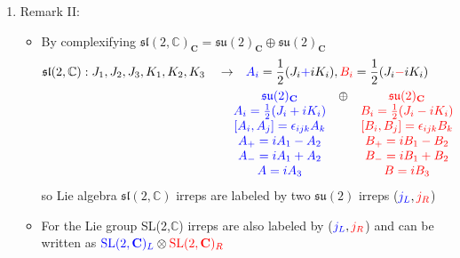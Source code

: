 \documentclass[../main.tex]{subfiles}
\begin{document}
\begin{enumerate}
\item Remark II:
\begin{itemize}
\item By complexifying $\mathfrak{sl}(2,\mathbb{C})_\mathbf{C}=\mathfrak{su}(2)_\mathbf{C}\oplus\mathfrak{su}(2)_\mathbf{C}$
\begin{align}
\mathfrak{sl}(2,\mathbb{C}): J_1,J_2,J_3,K_1,K_2,K_3\quad\rightarrow&\quad \textcolor{blue}{A_i}=\frac{1}{2}(J_i\textcolor{blue}{+}iK_i),\textcolor{red}{B_i}=\frac{1}{2}(J_i\textcolor{red}{-}iK_i)\\
&\begin{matrix}
\textcolor{blue}{\mathfrak{su}(2)_\mathbf{C}} & \oplus & \textcolor{red}{\mathfrak{su}(2)_\mathbf{C}}\\
\textcolor{blue}{A_i=\frac{1}{2}(J_i+iK_i)}   &        & \textcolor{red}{B_i=\frac{1}{2}(J_i-iK_i)}\\
\textcolor{blue}{[A_i,A_j]=\epsilon_{ijk}A_k} &        & \textcolor{red}{[B_i,B_j]=\epsilon_{ijk}B_k}\\
\textcolor{blue}{A_+=iA_1-A_2}                &        & \textcolor{red}{B_+=iB_1-B_2}\\
\textcolor{blue}{A_-=iA_1+A_2}                &        & \textcolor{red}{B_-=iB_1+B_2}\\
\textcolor{blue}{A  =iA_3}                    &        & \textcolor{red}{B  =iB_3}
\end{matrix}
\end{align}
so Lie algebra $\mathfrak{sl}(2,\mathbb{C})$ irreps are labeled by two $\mathfrak{su}(2)$ irreps ($\textcolor{blue}{j_L},\textcolor{red}{j_R}$)
\item For the Lie group SL(2,$\mathbb{C}$) irreps are also labeled by ($\textcolor{blue}{j_L},\textcolor{red}{j_R}$) and can be written as $\textcolor{blue}{\text{SL}(2,\mathbf{C})_L}\otimes\textcolor{red}{\text{SL}(2,\mathbf{C})_R}$
\end{itemize}
\end{enumerate}
\end{document}
